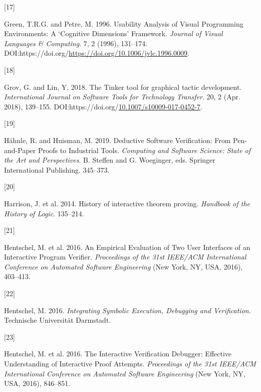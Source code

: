 \documentclass[
]{article}
\newlength{\cslhangindent}
\newlength{\csllabelwidth}
\newlength{\cslentryspacingunit} %
\newenvironment{CSLReferences}[2] %
 {%
  \setlength{\parindent}{0pt}
  \ifodd #1
  \let\oldpar\par
  \def\par{\hangindent=\cslhangindent\oldpar}
  \fi
  \setlength{\parskip}{#2\cslentryspacingunit}
 }%
 {}
\newcommand{\CSLLeftMargin}[1]{\parbox[t]{\csllabelwidth}{#1}}
\newcommand{\CSLRightInline}[1]{\parbox[t]{\linewidth - \csllabelwidth}{#1}\break}
\begin{document}
\begin{CSLReferences}{0}{0}
\leavevmode{}%
\CSLLeftMargin{{[}17{]} }
\CSLRightInline{Green, T.R.G. and Petre, M. 1996. Usability {Analysis}
of {Visual} {Programming} {Environments}: {A} {`{Cognitive}
{Dimensions}'} {Framework}. \emph{Journal of Visual Languages \&
Computing}. 7, 2 (1996), 131--174.
DOI:https://doi.org/\url{https://doi.org/10.1006/jvlc.1996.0009}.}

\leavevmode{}%
\CSLLeftMargin{{[}18{]} }
\CSLRightInline{Grov, G. and Lin, Y. 2018. The {Tinker} tool for
graphical tactic development. \emph{International Journal on Software
Tools for Technology Transfer}. 20, 2 (Apr. 2018), 139--155.
DOI:https://doi.org/\href{https://doi.org/10.1007/s10009-017-0452-7}{10.1007/s10009-017-0452-7}.}

\leavevmode{}%
\CSLLeftMargin{{[}19{]} }
\CSLRightInline{Hähnle, R. and Huisman, M. 2019. Deductive {Software}
{Verification}: {From} {Pen}-and-{Paper} {Proofs} to {Industrial}
{Tools}. \emph{Computing and {Software} {Science}: {State} of the {Art}
and {Perspectives}}. B. Steffen and G. Woeginger, eds. Springer
International Publishing. 345--373.}

\leavevmode{}%
\CSLLeftMargin{{[}20{]} }
\CSLRightInline{Harrison, J. et al. 2014. History of interactive theorem
proving. \emph{Handbook of the History of Logic}. 135--214.}

\leavevmode{}%
\CSLLeftMargin{{[}21{]} }
\CSLRightInline{Hentschel, M. et al. 2016. An {Empirical} {Evaluation}
of {Two} {User} {Interfaces} of an {Interactive} {Program} {Verifier}.
\emph{Proceedings of the 31st {IEEE}/{ACM} {International} {Conference}
on {Automated} {Software} {Engineering}} (New York, NY, USA, 2016),
403--413.}

\leavevmode{}%
\CSLLeftMargin{{[}22{]} }
\CSLRightInline{Hentschel, M. 2016. \emph{Integrating {Symbolic}
{Execution}, {Debugging} and {Verification}}. Technische Universität
Darmstadt.}

\leavevmode{}%
\CSLLeftMargin{{[}23{]} }
\CSLRightInline{Hentschel, M. et al. 2016. The {Interactive}
{Verification} {Debugger}: {Effective} {Understanding} of {Interactive}
{Proof} {Attempts}. \emph{Proceedings of the 31st {IEEE}/{ACM}
{International} {Conference} on {Automated} {Software} {Engineering}}
(New York, NY, USA, 2016), 846--851.}


\end{CSLReferences}
\end{document}

